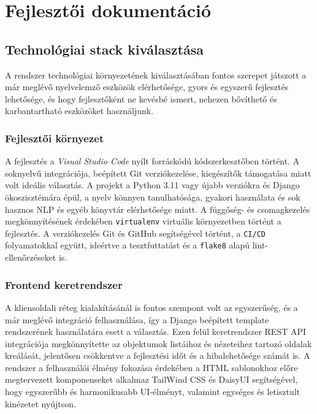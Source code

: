 \chapter{Fejlesztői dokumentáció}
\label{ch:impl}

\section{Technológiai stack kiválasztása}

A rendszer technológiai környezetének kiválasztásában fontos szerepet játszott a már meglévő nyelvelemző eszközök elérhetősége, gyors és egyszerű fejlesztés lehetősége, és hogy fejlesztőként ne kevésbé ismert, nehezen bővíthető és karbantartható eszközöket használjunk.

\subsection{Fejlesztői környezet}

A fejlesztés a \textit{Visual Studio Code} nyílt forráskódú kódszerkesztőben történt. A soknyelvű integrációja, beépített Git verziókezelése, kiegészítők támogatása miatt volt ideális választás. A projekt a Python 3.11 vagy újabb verziókra és Django ökoszisztémára épül, a nyelv könnyen tanulhatósága, gyakori használata és sok hasznos NLP és egyéb könyvtár elérhetősége miatt. A függőség- és csomagkezelés megkönnyítésének érdekében \texttt{virtualenv} virtuális környezetben történt a fejlesztés. A verziókezelés Git és GitHub segítségével történt, a \texttt{CI/CD} folyamatokkal együtt, ideértve a tesztfuttatást és a \texttt{flake8} alapú lint-ellenőrzéseket is. 

\subsection{Frontend keretrendszer}

A kliensoldali réteg kialakításánál is fontos szempont volt az egyszerűség, és a már meglévő integráció felhasználása, így a Django beépített template rendszerének használatára esett a választás. Ezen felül keretrendszer REST API integrációja megkönnyítette az objektumok listáihoz és nézeteihez tartozó oldalak kreálását, jelentősen csökkentve a fejlesztési időt és a hibalehetősége számát is. A rendszer a felhasználói élmény fokozása érdekében a HTML sablonokhoz előre megtervezett komponenseket alkalmaz TailWind CSS és DaisyUI segítségével, hogy egyszerűbb és harmonikusabb UI-élményt, valamint egységes és letisztult kinézetet nyújtson. 

